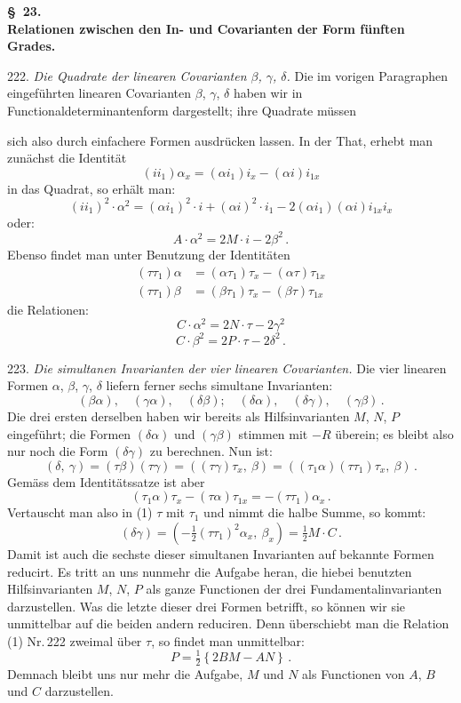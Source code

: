 \documentclass[11pt]{article}
\providecommand{\weberpage}[1]{}
\providecommand{\weq}[2]{\begin{equation}\tag{#1}#2\end{equation}}
\begin{document}
\begin{center}
\textbf{\S~23.}\\
\textbf{Relationen zwischen den In- und Covarianten der Form f\"unften Grades.}
\end{center}

222. \textit{Die Quadrate der linearen Covarianten $\beta$, $\gamma$, $\delta$.} Die im vorigen Paragraphen eingef\"uhrten linearen Covarianten $\beta$, $\gamma$, $\delta$ haben wir in Functionaldeterminantenform dargestellt; ihre Quadrate m\"ussen


\weberpage{248}
sich also durch einfachere Formen ausdr\"ucken lassen. In der That, erhebt man zun\"achst die Identit\"at
\[
(ii_1)\alpha_x = (\alpha i_1)i_x - (\alpha i)i_{1x}
\]
in das Quadrat, so erh\"alt man:
\[
(ii_1)^2 \cdot \alpha^2 = (\alpha i_1)^2 \cdot i + (\alpha i)^2 \cdot i_1 - 2(\alpha i_1)(\alpha i)i_{1x}i_x
\]
oder:
\weq{1}{A \cdot \alpha^2 = 2M \cdot i - 2\beta^2\,.}
Ebenso findet man unter Benutzung der Identit\"aten
\[
\begin{aligned}
(\tau\tau_1)\alpha &= (\alpha\tau_1)\tau_x - (\alpha\tau)\tau_{1x} \\
(\tau\tau_1)\beta &= (\beta\tau_1)\tau_x - (\beta\tau)\tau_{1x}
\end{aligned}
\]
die Relationen:
\weq{2}{C \cdot \alpha^2 = 2N \cdot \tau - 2\gamma^2}
\weq{3}{C \cdot \beta^2 = 2P \cdot \tau - 2\delta^2\,.}

223. \textit{Die simultanen Invarianten der vier linearen Covarianten.} Die vier linearen Formen $\alpha$, $\beta$, $\gamma$, $\delta$ liefern ferner sechs simultane Invarianten:
\[
(\beta\alpha),\quad (\gamma\alpha),\quad (\delta\beta);\quad (\delta\alpha),\quad (\delta\gamma),\quad (\gamma\beta)\,.
\]
Die drei ersten derselben haben wir bereits als Hilfsinvarianten $M$, $N$, $P$ eingef\"uhrt; die Formen $(\delta\alpha)$ und $(\gamma\beta)$ stimmen mit $-R$ \"uberein; es bleibt also nur noch die Form $(\delta\gamma)$ zu berechnen. Nun ist:
\weq{1}{(\delta,\ \gamma) = (\tau\beta)(\tau\gamma) = ((\tau\gamma)\tau_x,\ \beta) = ((\tau_1\alpha)(\tau\tau_1)\tau_x,\ \beta)\,.}
Gem\"ass dem Identit\"atssatze ist aber
\[
(\tau_1\alpha)\tau_x - (\tau\alpha)\tau_{1x} = -(\tau\tau_1)\alpha_x\,.
\]
Vertauscht man also in (1) $\tau$ mit $\tau_1$ und nimmt die halbe Summe, so kommt:
\weq{2}{(\delta\gamma) = \left(-\tfrac{1}{2}(\tau\tau_1)^2 \alpha_x,\ \beta_x\right) = \tfrac{1}{2} M \cdot C\,.}
Damit ist auch die sechste dieser simultanen Invarianten auf bekannte Formen reducirt. Es tritt an uns nunmehr die Aufgabe heran, die hiebei benutzten Hilfsinvarianten $M$, $N$, $P$ als ganze Functionen der drei Fundamentalinvarianten darzustellen. Was die letzte dieser drei Formen betrifft, so k\"onnen wir sie unmittelbar auf die beiden andern reduciren. Denn \"uberschiebt man die Relation (1) Nr.\,222 zweimal \"uber $\tau$, so findet man unmittelbar:
\weq{3}{P = \tfrac{1}{2}\left\{2BM - AN\right\}\,.}
Demnach bleibt uns nur mehr die Aufgabe, $M$ und $N$ als Functionen von $A$, $B$ und $C$ darzustellen.
\end{document}
